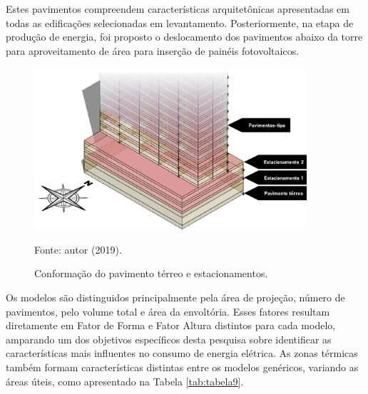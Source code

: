 \noindent Estes pavimentos compreendem características arquitetônicas apresentadas em todas as edificações selecionadas em levantamento. Posteriormente, na etapa de produção de energia, foi proposto o deslocamento dos pavimentos abaixo da torre para aproveitamento de área para inserção de painéis fotovoltaicos.
\begin{figure}[H]
    \centering
    \caption{Conformação do pavimento térreo e estacionamentos.}
    \includegraphics[width=0.9\textwidth]{figures/fig12-base_torre-1.png}
    \begin{flushleft}
        \par \small Fonte: autor (2019).
    \end{flushleft}
    \label{fig:figura10}
\end{figure}\vspace*{-0.5cm}
\noindent Os modelos são distinguidos principalmente pela área de projeção, número de pavimentos, pelo volume total e área da envoltória. Esses fatores resultam diretamente em Fator de Forma e Fator Altura distintos para cada modelo, amparando um dos objetivos específicos desta pesquisa sobre identificar as características mais influentes no consumo de energia elétrica. As zonas térmicas também formam características distintas entre os modelos genéricos, variando as áreas úteis, como apresentado na Tabela \ref{tab:tabela9}.
